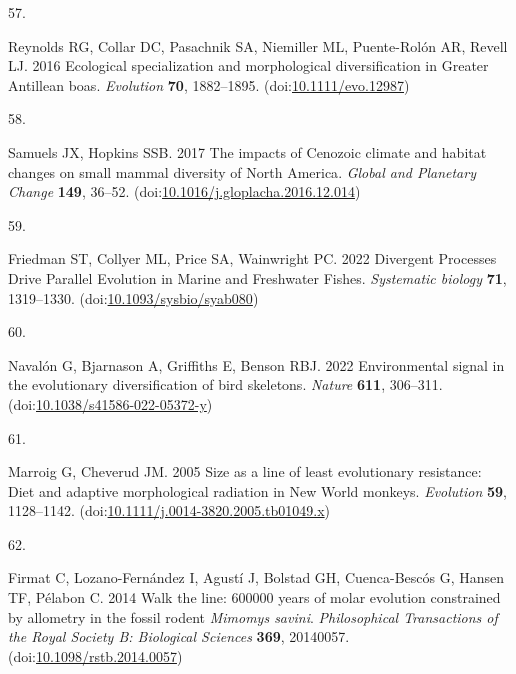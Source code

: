 \documentclass[
  11pt,
]{article}
\newlength{\cslhangindent}
\newlength{\csllabelwidth}
\newlength{\cslentryspacingunit} %
\newenvironment{CSLReferences}[2] %
 {%
  \setlength{\parindent}{0pt}
  \ifodd #1
  \let\oldpar\par
  \def\par{\hangindent=\cslhangindent\oldpar}
  \fi
  \setlength{\parskip}{#2\cslentryspacingunit}
 }%
 {}
\newcommand{\CSLLeftMargin}[1]{\parbox[t]{\csllabelwidth}{#1}}
\newcommand{\CSLRightInline}[1]{\parbox[t]{\linewidth - \csllabelwidth}{#1}\break}
\begin{document}
\begin{CSLReferences}{0}{0}
\leavevmode{}%
\CSLLeftMargin{57. }%
\CSLRightInline{Reynolds RG, Collar DC, Pasachnik SA, Niemiller ML,
Puente-Rolón AR, Revell LJ. 2016 {Ecological specialization and
morphological diversification in {G}reater {A}ntillean boas}.
\emph{Evolution} \textbf{70}, 1882--1895.
(doi:\href{https://doi.org/10.1111/evo.12987}{10.1111/evo.12987})}

\leavevmode{}%
\CSLLeftMargin{58. }%
\CSLRightInline{Samuels JX, Hopkins SSB. 2017 {The impacts of {C}enozoic
climate and habitat changes on small mammal diversity of {N}orth
{A}merica}. \emph{Global and Planetary Change} \textbf{149}, 36--52.
(doi:\href{https://doi.org/10.1016/j.gloplacha.2016.12.014}{10.1016/j.gloplacha.2016.12.014})}

\leavevmode{}%
\CSLLeftMargin{59. }%
\CSLRightInline{Friedman ST, Collyer ML, Price SA, Wainwright PC. 2022
{Divergent Processes Drive Parallel Evolution in Marine and Freshwater
Fishes}. \emph{Systematic biology} \textbf{71}, 1319--1330.
(doi:\href{https://doi.org/10.1093/sysbio/syab080}{10.1093/sysbio/syab080})}

\leavevmode{}%
\CSLLeftMargin{60. }%
\CSLRightInline{Navalón G, Bjarnason A, Griffiths E, Benson RBJ. 2022
{Environmental signal in the evolutionary diversification of bird
skeletons}. \emph{Nature} \textbf{611}, 306--311.
(doi:\href{https://doi.org/10.1038/s41586-022-05372-y}{10.1038/s41586-022-05372-y})}

\leavevmode{}%
\CSLLeftMargin{61. }%
\CSLRightInline{Marroig G, Cheverud JM. 2005 Size as a line of least
evolutionary resistance: Diet and adaptive morphological radiation in
{N}ew {W}orld monkeys. \emph{Evolution} \textbf{59}, 1128--1142.
(doi:\href{https://doi.org/10.1111/j.0014-3820.2005.tb01049.x}{10.1111/j.0014-3820.2005.tb01049.x})}

\leavevmode{}%
\CSLLeftMargin{62. }%
\CSLRightInline{Firmat C, Lozano-Fernández I, Agustí J, Bolstad GH,
Cuenca-Bescós G, Hansen TF, Pélabon C. 2014 Walk the line: 600000 years
of molar evolution constrained by allometry in the fossil rodent
\emph{{M}imomys savini}. \emph{Philosophical Transactions of the Royal
Society B: Biological Sciences} \textbf{369}, 20140057.
(doi:\href{https://doi.org/10.1098/rstb.2014.0057}{10.1098/rstb.2014.0057})}


\end{CSLReferences}
\end{document}
